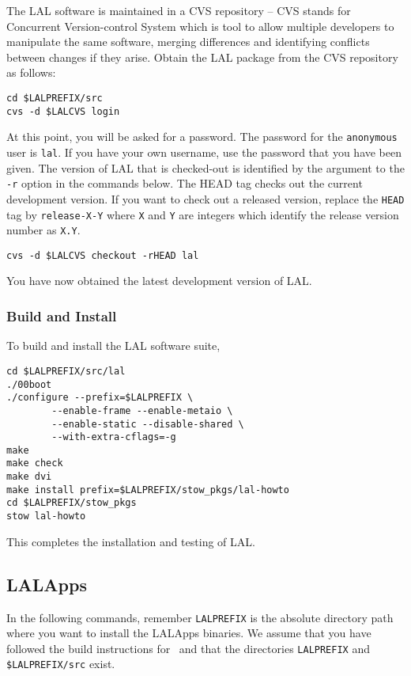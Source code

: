 The LAL software is maintained in a CVS repository -- CVS stands for
Concurrent Version-control System which is tool to allow multiple developers
to manipulate the same software,  merging differences and identifying
conflicts between changes if they arise.  Obtain the LAL package from the CVS
repository as follows:  
\begin{verbatim}
cd $LALPREFIX/src
cvs -d $LALCVS login
\end{verbatim}
At this point,  you will be asked for a password.  The password for the
\verb+anonymous+ user is \verb+lal+. If you have your own username, use the
password that you have been given.
The version of LAL that is checked-out is identified by the argument
to the \texttt{-r} option in the commands below.   The HEAD tag checks out the
current development version.  If you want to check out a released
version, replace the \verb+HEAD+ tag by \verb+release-X-Y+ where
\verb+X+ and \verb+Y+ are integers which identify the release version
number as \verb+X.Y+.
\begin{verbatim}
cvs -d $LALCVS checkout -rHEAD lal
\end{verbatim}
You have now obtained the latest development version of LAL.

\subsubsection{Build and Install}
To build and install the LAL software suite, 
\begin{verbatim}
cd $LALPREFIX/src/lal
./00boot
./configure --prefix=$LALPREFIX \
        --enable-frame --enable-metaio \
        --enable-static --disable-shared \
        --with-extra-cflags=-g
make
make check
make dvi
make install prefix=$LALPREFIX/stow_pkgs/lal-howto
cd $LALPREFIX/stow_pkgs
stow lal-howto
\end{verbatim}
This completes the installation and testing of LAL.  

\color{black}
\subsection{LALApps}
\color{black}

In the following commands, remember \verb+LALPREFIX+ is the absolute
directory path where you want to install the LALApps binaries.  We
assume that you have followed the build instructions for \lal\ and
that the directories \verb+LALPREFIX+ and \verb+$LALPREFIX/src+ exist.

